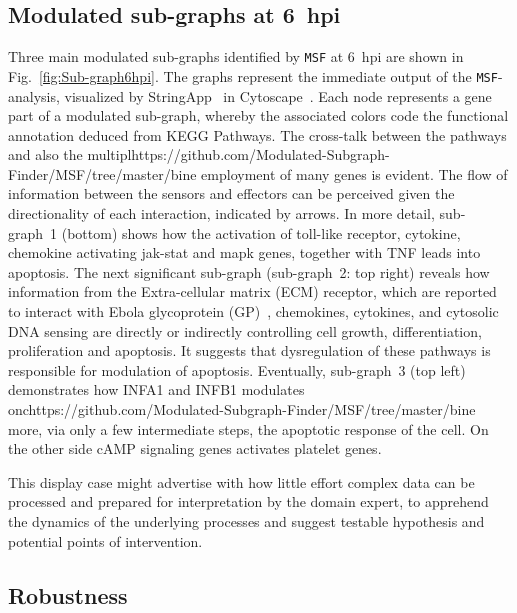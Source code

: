 \documentclass[10pt,a4paper,twocolumn]{article}
\begin{document}
	\subsection*{Modulated sub-graphs at 6~hpi}
	
	Three main modulated sub-graphs identified by \texttt{MSF} at
        6~hpi are shown in Fig.~\ref{fig:Sub-graph6hpi}. The graphs
        represent the immediate output of the \texttt{MSF}-analysis,
        visualized by StringApp~\cite{StringApp} in
        Cytoscape~\cite{Cyto}. Each node represents a gene part of a
        modulated sub-graph, whereby the associated colors code the
        functional annotation deduced from KEGG Pathways. The
        cross-talk between the pathways and also the multiplhttps://github.com/Modulated-Subgraph-Finder/MSF/tree/master/bine
        employment of many genes is evident. The flow of information
        between the sensors and effectors can be perceived given the
        directionality of each interaction, indicated by arrows.  In
        more detail, sub-graph~1 (bottom) shows how the activation of
        toll-like receptor, cytokine, chemokine activating jak-stat
        and mapk genes, together with TNF leads into apoptosis. The
        next significant sub-graph (sub-graph~2: top right) reveals
        how information from the Extra-cellular matrix (ECM) receptor,
        which are reported to interact with Ebola glycoprotein
        (GP)~\cite{Veljkovic}, chemokines, cytokines, and cytosolic
        DNA sensing are directly or indirectly controlling cell
        growth, differentiation, proliferation and apoptosis. It
        suggests that dysregulation of these pathways is responsible
        for modulation of apoptosis. Eventually, sub-graph~3 (top
        left) demonstrates how INFA1 and INFB1 modulates onchttps://github.com/Modulated-Subgraph-Finder/MSF/tree/master/bine more,
        via only a few intermediate steps, the apoptotic response of
        the cell. On the other side cAMP signaling genes activates
        platelet genes.
	
	This display case might advertise with how little effort
        complex data can be processed and prepared for
          interpretation by the domain expert, to apprehend the dynamics of the underlying processes
        and suggest testable hypothesis and potential points of
        intervention.
	
	\subsection*{Robustness}
	
\end{document}
